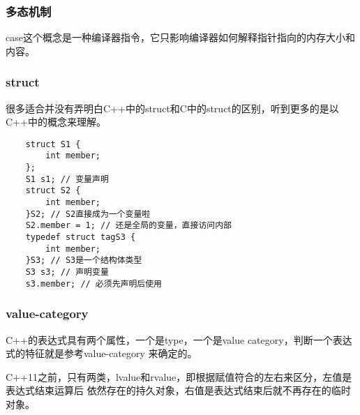 \subsubsection{多态机制}
case这个概念是一种编译器指令，它只影响编译器如何解释指针指向的内存大小和内容。

\subsubsection{struct}
很多适合并没有弄明白C++中的struct和C中的struct的区别，听到更多的是以C++中的概念来理解。
\begin{lstlisting}
    struct S1 {
        int member;
    };
    S1 s1; // 变量声明
    struct S2 {
        int member;
    }S2; // S2直接成为一个变量啦
    S2.member = 1; // 还是全局的变量，直接访问内部
    typedef struct tagS3 {
        int member;
    }S3; // S3是一个结构体类型
    S3 s3; // 声明变量
    s3.member; // 必须先声明后使用
\end{lstlisting}

\subsubsection{value-category}
C++的表达式具有两个属性，一个是type，一个是value category，判断一个表达式的特征就是参考value-category
来确定的。

C++11之前，只有两类，lvalue和rvalue，即根据赋值符合的左右来区分，左值是表达式结束运算后
依然存在的持久对象，右值是表达式结束后就不再存在的临时对象。

